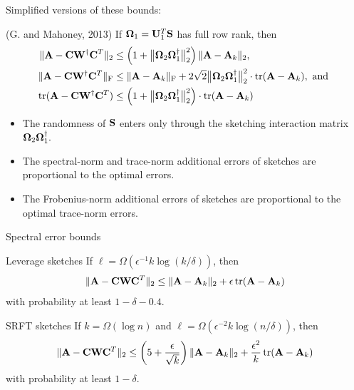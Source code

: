 \documentclass[xcolor=x11names,compress,ignorenonframetext]{beamer}
\renewcommand{\(}{\begin{columns}}
\renewcommand{\)}{\end{columns}}
\newcommand{\<}[1]{\begin{column}{#1}}
\renewcommand{\>}{\end{column}}
\def\refcolor{DodgerBlue4}
\newcommand{\refer}[1]{({\color{\refcolor}#1})}
\begin{document}
\begin{frame} 
 Simplified versions of these bounds:
 \begin{block}{\refer{G. and Mahoney, 2013}}
 If $\boldsymbol{\Omega}_1 = \mathbf{U}_1^T \mathbf{S}$ has full row rank, then
 \begin{align*}
 \|\mathbf{A} - \mathbf{C} \mathbf{W}^\dagger \mathbf{C}^T\|_2 & \leq \left(1 + \big\|\boldsymbol{\Omega}_2 \boldsymbol{\Omega}_1^\dagger\big\|_2^2\right) \|\mathbf{A} - \mathbf{A}_k\|_2 , \\
 \|\mathbf{A} - \mathbf{C} \mathbf{W}^\dagger \mathbf{C}^T\|_{\mathrm{F}} & \leq \|\mathbf{A} - \mathbf{A}_k\|_{\mathrm{F}} + 2\sqrt{2} 
 \big\| {\boldsymbol{\Omega}_2 \boldsymbol{\Omega}_1^\dagger} \big\|_2^2 \cdot \operatorname{tr}(\mathbf{A} - \mathbf{A}_k), \text{ and } \\
 \operatorname{tr}(\mathbf{A} - \mathbf{C} \mathbf{W}^\dagger \mathbf{C}^T) & \leq 
  \left(1+ \big\| { \boldsymbol{\Omega}_2 \boldsymbol{\Omega}_1^\dagger} \big\|_2^2 \right) \cdot \operatorname{tr}(\mathbf{A} - \mathbf{A}_k)
 \end{align*}
 \end{block}
 
\begin{itemize}
 \item The randomness of $\mathbf{S}$ enters only through the sketching interaction matrix  ${\boldsymbol{\Omega}_2 \boldsymbol{\Omega}_1^\dagger}.$
 \item The spectral-norm and trace-norm additional errors of sketches are proportional to the optimal errors.
 \item The Frobenius-norm additional errors of sketches are proportional to the optimal trace-norm errors.
\end{itemize}

\end{frame}

 \begin{frame}{Spectral error bounds}
  \begin{block}{Leverage sketches}
  If $\ell = \Omega(\epsilon^{-1} k \log(k/\delta))$, then 
  \[
   \|\mathbf{A} - \mathbf{C} \mathbf{W} \mathbf{C}^T\|_2 \leq \|\mathbf{A} - \mathbf{A}_k\|_2 + \epsilon \operatorname{tr}(\mathbf{A} - \mathbf{A}_k)
  \]
  with probability at least $1 - \delta - 0.4.$
 \end{block}
 
 \begin{block}{SRFT sketches}
   If $k = \Omega(\log n)$ and $\ell = \Omega(\epsilon^{-2}k \log(n/\delta))$, then
   \[
  \|\mathbf{A} - \mathbf{C} \mathbf{W} \mathbf{C}^T\|_2 \leq \left( 5 + \frac{\epsilon}{\sqrt{k}}\right) \|\mathbf{A} - \mathbf{A}_k\|_2 
   + \frac{\epsilon^2}{k} \operatorname{tr}(\mathbf{A} - \mathbf{A}_k)
  \]
  with probability at least $1 - \delta.$
 \end{block}

\end{frame}
\end{document}
